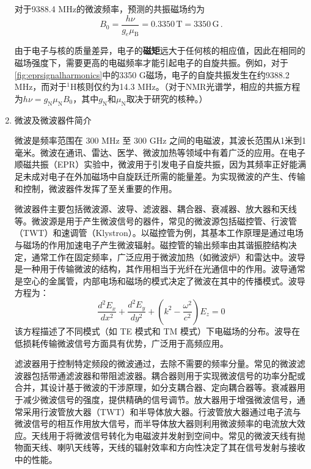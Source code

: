 \documentclass[dvipsnames, svgnames,a4paper,11pt]{article}
\begin{document}
\begin{enumerate}
		对于9388.4 MHz的微波频率，预测的共振磁场约为
		\begin{equation*}
			B_0 = \frac{h \nu}{g_e \mu_\text{B}} = 0.3350 \, \text{T} = 3350 \, \text{G} \, .
		\end{equation*}
		
		由于电子与核的质量差异，电子的\textbf{磁矩}远大于任何核的相应值，因此在相同的磁场强度下，需要更高的电磁频率才能引起电子的自旋共振。例如，对于\cref{fig:eprsignalharmonics}中的3350 G磁场，电子的自旋共振发生在约9388.2 MHz，而对于$^1$H核则仅约为14.3 MHz。（对于NMR光谱学，相应的共振方程为$h \nu = g_\mathrm{N} \mu_\mathrm{N} B_0$，其中$g_\mathrm{N}$和$\mu_\mathrm{N}$取决于研究的核种。）
		
		\item 微波及微波器件简介
		
		微波是频率范围在 300 MHz 至 300 GHz 之间的电磁波，其波长范围从1米到1毫米。微波在通讯、雷达、医学、微波加热等领域中有着广泛的应用。在电子顺磁共振（EPR）实验中，微波用于引发电子自旋共振，因为其频率正好能满足未成对电子在外加磁场中自旋跃迁所需的能量差。为实现微波的产生、传输和控制，微波器件发挥了至关重要的作用。
		
		
		微波器件主要包括微波源、波导、滤波器、耦合器、衰减器、放大器和天线等。微波源是用于产生微波信号的器件，常见的微波源包括磁控管、行波管（TWT）和速调管（Klystron）。以磁控管为例，其基本工作原理是通过电场与磁场的作用加速电子产生微波辐射。磁控管的输出频率由其谐振腔结构决定，通常工作在固定频率，广泛应用于微波加热（如微波炉）和雷达中。波导是一种用于传输微波的结构，其作用相当于光纤在光通信中的作用。波导通常是空心的金属管，内部电场和磁场的模式决定了微波在其中的传播模式。波导方程为：\[ \frac{d^2 E_x}{dx^2} + \frac{d^2 E_y}{dy^2} + \left( k^2 - \frac{\omega^2}{c^2} \right) E_z = 0 \]该方程描述了不同模式（如 TE 模式和 TM 模式）下电磁场的分布。波导在低损耗传输微波信号方面具有优势，广泛用于高频应用。
		
		滤波器用于控制特定频段的微波通过，去除不需要的频率分量。常见的微波滤波器包括带通滤波器和带阻滤波器。耦合器则用于实现微波信号的功率分配或合并，其设计基于微波的干涉原理，如分支耦合器、定向耦合器等。衰减器用于减少微波信号的强度，提供精确的信号调节。放大器用于增强微波信号，通常采用行波管放大器（TWT）和半导体放大器。行波管放大器通过电子流与微波信号的相互作用放大信号，而半导体放大器则利用微波频率的电流放大效应。天线用于将微波信号转化为电磁波并发射到空间中。常见的微波天线有抛物面天线、喇叭天线等，天线的辐射效率和方向性决定了其在信号发射与接收中的性能。
		

\end{enumerate}
\end{document}
